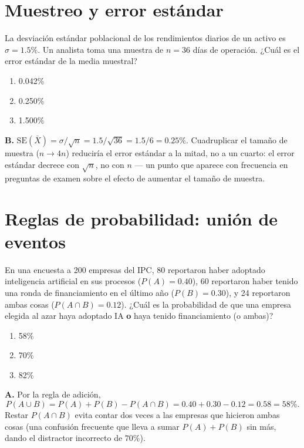 \documentclass[11pt,a4paper,oneside]{article}
\theoremstyle{definition}
\begin{document}
\section{Muestreo y error estándar}

\begin{cfaBox}
La desviación estándar poblacional de los rendimientos diarios de un
activo es $\sigma=1.5\%$. Un analista toma una muestra de $n=36$ días de
operación. ¿Cuál es el error estándar de la media muestral?
\begin{enumerate}[label=\Alph*.]
\item 0.042\%
\item 0.250\%
\item 1.500\%
\end{enumerate}
\end{cfaBox}
\begin{solBox}
\textbf{B.} $\mathrm{SE}(\bar X)=\sigma/\sqrt{n}=1.5/\sqrt{36}=1.5/6=0.25\%$.
Cuadruplicar el tamaño de muestra ($n\to4n$) reduciría el error estándar a
la mitad, no a un cuarto: el error estándar decrece con $\sqrt n$, no con
$n$ --- un punto que aparece con frecuencia en preguntas de examen sobre
el efecto de aumentar el tamaño de muestra.
\end{solBox}

\section{Reglas de probabilidad: unión de eventos}

\begin{cfaBox}
En una encuesta a 200 empresas del IPC, 80 reportaron haber adoptado
inteligencia artificial en sus procesos ($P(A)=0.40$), 60 reportaron haber
tenido una ronda de financiamiento en el último año ($P(B)=0.30$), y 24
reportaron ambas cosas ($P(A\cap B)=0.12$). ¿Cuál es la probabilidad de
que una empresa elegida al azar haya adoptado IA \textbf{o} haya tenido
financiamiento (o ambas)?
\begin{enumerate}[label=\Alph*.]
\item 58\%
\item 70\%
\item 82\%
\end{enumerate}
\end{cfaBox}
\begin{solBox}
\textbf{A.} Por la regla de adición,
\[
P(A\cup B)=P(A)+P(B)-P(A\cap B)=0.40+0.30-0.12=0.58=58\%.
\]
Restar $P(A\cap B)$ evita contar dos veces a las empresas que hicieron
ambas cosas (una confusión frecuente que lleva a sumar $P(A)+P(B)$ sin
más, dando el distractor incorrecto de $70\%$).
\end{solBox}
\end{document}

